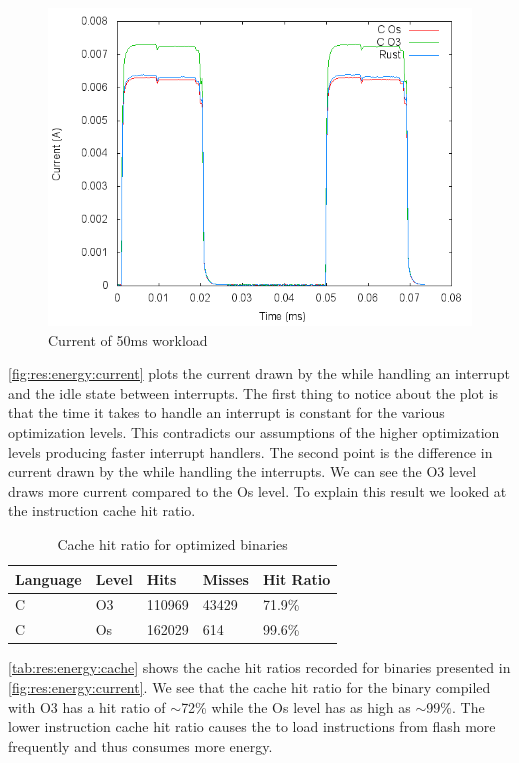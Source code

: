 \begin{figure}[H]
  \includegraphics[width=\textwidth]{results/plots/energy/irq/50.png}
  \caption{Current of 50ms workload}
  \label{fig:res:energy:current}
\end{figure}

\autoref{fig:res:energy:current} plots the current drawn by the {\gecko} while handling an interrupt and the idle state between interrupts.
The first thing to notice about the plot is that the time it takes to handle an interrupt is constant for the various optimization levels.
This contradicts our assumptions of the higher optimization levels producing faster interrupt handlers.
The second point is the difference in current drawn by the {\gecko} while handling the interrupts.
We can see the O3 level draws more current compared to the Os level.
To explain this result we looked at the instruction cache hit ratio.

\begin{table}[H]
  \centering
  \begin{tabular}{l | l | l | l | l}
    \textbf{Language} & \textbf{Level} & \textbf{Hits} & \textbf{Misses} & \textbf{Hit Ratio} \\
    \hline
    C & O3 & 110969 & 43429 & 71.9\% \\
    C & Os & 162029 & 614 & 99.6\% \\
    \hline
  \end{tabular}
  \caption{Cache hit ratio for optimized {\C} binaries}
  \label{tab:res:energy:cache}
\end{table}

\autoref{tab:res:energy:cache} shows the cache hit ratios recorded for binaries presented in \autoref{fig:res:energy:current}.
We see that the cache hit ratio for the binary compiled with O3 has a hit ratio of $\sim$72\% while the Os level has as high as $\sim$99\%.
The lower instruction cache hit ratio causes the {\gecko} to load instructions from flash more frequently and thus consumes more energy.
